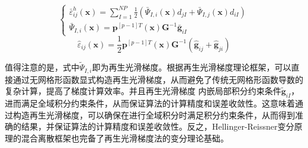 \begin{equation}
\begin{cases}\label{case2}
    \bar{\varepsilon}^h_{ij}(\pmb{x})=\displaystyle\sum_{I=1}^{N\!P}\frac{1}{2}(\bar{\Psi}_{I,i}(\pmb{x})d_{jI}+\bar{\Psi}_{I,j}(\pmb{x})d_{iI})\\
    \bar{\Psi}_{I,i}(\pmb{x})=\pmb{p}^{[p-1]T}(\pmb{x})\pmb{G}^{-1}\bar{\pmb g}_{iI}
\end{cases}
\end{equation}
\begin{equation}\label{case3}
    \hat{\varepsilon}_{ij}(\pmb{x})=\frac{1}{2}\pmb{p}^{[p-1]T}(\pmb{x})\pmb{G}^{-1}(\hat{\pmb g}_{ij}+\hat{\pmb g}_{ji})
\end{equation} \par
值得注意的是，式中$\tilde{\Psi}_{I,i}$即为再生光滑梯度\cite{}。根据再生光滑梯度理论框架，可以直接通过无网格形函数显式构造再生光滑梯度，从而避免了传统无网格形函数导数的复杂计算，提高了梯度计算效率。并且再生光滑梯度
内嵌局部积分约束条件$\tilde{\pmb g}_{iI}$，进而满足全域积分约束条件，从而保证算法的计算精度和误差收敛性。这意味着通过构造再生光滑梯度，可以确保在进行全域积分时满足积分约束条件，从而得到准确的结果，并保证算法的计算精度和误差收敛性。反之，Hellinger-Reissner变分原理的混合离散框架也完备了再生光滑梯度法的变分理论基础。\par

